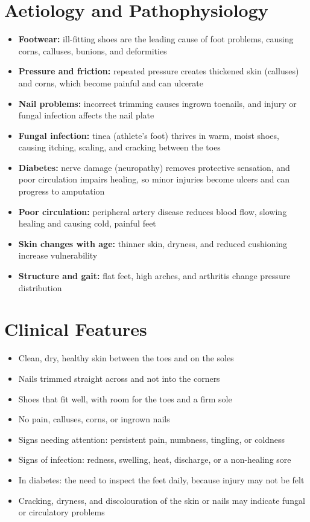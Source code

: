 \section*{Aetiology and Pathophysiology}
\begin{itemize}
    \item \textbf{Footwear:} ill-fitting shoes are the leading cause of foot problems, causing corns, calluses, bunions, and deformities
    \item \textbf{Pressure and friction:} repeated pressure creates thickened skin (calluses) and corns, which become painful and can ulcerate
    \item \textbf{Nail problems:} incorrect trimming causes ingrown toenails, and injury or fungal infection affects the nail plate
    \item \textbf{Fungal infection:} tinea (athlete's foot) thrives in warm, moist shoes, causing itching, scaling, and cracking between the toes
    \item \textbf{Diabetes:} nerve damage (neuropathy) removes protective sensation, and poor circulation impairs healing, so minor injuries become ulcers and can progress to amputation
    \item \textbf{Poor circulation:} peripheral artery disease reduces blood flow, slowing healing and causing cold, painful feet
    \item \textbf{Skin changes with age:} thinner skin, dryness, and reduced cushioning increase vulnerability
    \item \textbf{Structure and gait:} flat feet, high arches, and arthritis change pressure distribution
\end{itemize}

\section*{Clinical Features}
\begin{itemize}
    \item Clean, dry, healthy skin between the toes and on the soles
    \item Nails trimmed straight across and not into the corners
    \item Shoes that fit well, with room for the toes and a firm sole
    \item No pain, calluses, corns, or ingrown nails
    \item Signs needing attention: persistent pain, numbness, tingling, or coldness
    \item Signs of infection: redness, swelling, heat, discharge, or a non-healing sore
    \item In diabetes: the need to inspect the feet daily, because injury may not be felt
    \item Cracking, dryness, and discolouration of the skin or nails may indicate fungal or circulatory problems
\end{itemize}

